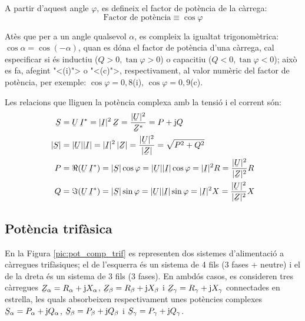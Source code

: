 A partir d'aquest angle $\varphi$, es
defineix el factor de pot\`{e}ncia de la c\`{a}rrega:
\begin{equation}
   \text{Factor de pot\`{e}ncia} \equiv \cos\varphi
\end{equation}

At\`{e}s que per a un angle qualsevol $\alpha$, es compleix la igualtat
trigonom\`{e}trica: $\cos\alpha = \cos(-\alpha)$, quan es d\'{o}na el factor
de pot\`{e}ncia d'una c\`{a}rrega, cal especificar si \'{e}s inductiu ($Q>0,
\tan\varphi>0$) o capacitiu ($Q<0, \tan\varphi<0$); aix\`{o} es fa,
afegint {"<}(i){">} o {"<}(c){">}, respectivament, al valor num\`{e}ric del factor
de pot\`{e}ncia, per exemple: $\cos\varphi=0,8$(i),
$\cos\varphi=0,9$(c).

Les relacions que lliguen la pot\`{e}ncia complexa amb la tensi\'{o} i el corrent s\'{o}n:
\begin{align}
   \cmplx{S} &=  \cmplx{U} \,\cmplx{I}^* =
   |\cmplx{I}|^2 \,\cmplx{Z} = \frac{|\cmplx{U}|^2}{\cmplx{Z}^*} =
   P + \ju Q \label{eq:s_mono1}\\
   |\cmplx{S}| &= |\cmplx{U}| |\cmplx{I}| =
   |\cmplx{I}|^2 \,|\cmplx{Z}| = \frac{|\cmplx{U}|^2}{|\cmplx{Z}|} =
   \sqrt{P^2+Q^2} \\
   P &= \Re (\cmplx{U} \, \cmplx{I}^*) = |\cmplx{S}| \cos\varphi =
   |\cmplx{U}| |\cmplx{I}| \cos\varphi = |\cmplx{I}|^2 R =
   \frac{|\cmplx{U}|^2}{|\cmplx{Z}|^2}R\\
   Q &= \Im (\cmplx{U} \, \cmplx{I}^*) = |\cmplx{S}| \sin\varphi =
   |\cmplx{U}| |\cmplx{I}|\sin\varphi  = |\cmplx{I}|^2 X =
   \frac{|\cmplx{U}|^2}{|\cmplx{Z}|^2}X
\end{align}

\subsection{Pot\`{e}ncia trif\`{a}sica} 

En la Figura \vref{pic:pot_comp_trif} es representen dos sistemes
d'alimentaci\'{o} a c\`{a}rregues trif\`{a}siques; el de l'esquerra \'{e}s un
sistema de 4 fils (3 fases + neutre) i el de la dreta \'{e}s un sistema
de 3 fils (3 fases). En ambd\'{o}s casos, es consideren tres c\`{a}rregues
$\cmplx{Z}_\alpha = R_\alpha + \ju X_\alpha$, $\cmplx{Z}_\beta=
R_\beta + \ju X_\beta$ i $\cmplx{Z}_\gamma= R_\gamma + \ju X_\gamma$
connectades en estrella, les quals absorbeixen respectivament unes
pot\`{e}ncies complexes $\cmplx{S}_\alpha= P_\alpha + \ju Q_\alpha$,
$\cmplx{S}_\beta= P_\beta + \ju Q_\beta$ i $\cmplx{S}_\gamma=
P_\gamma + \ju Q_\gamma$.

